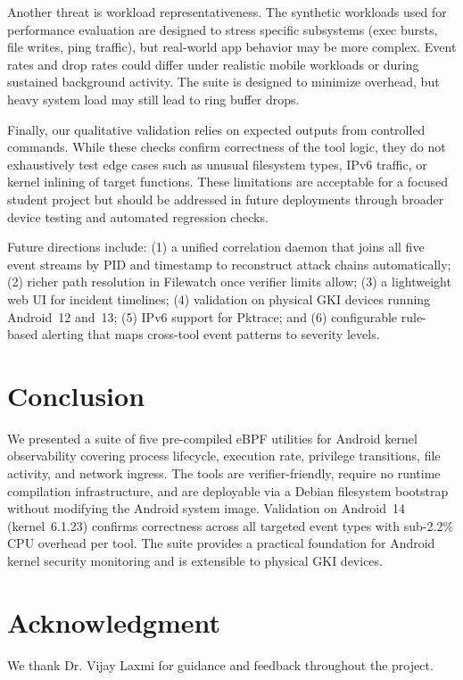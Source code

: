 \documentclass[conference]{IEEEtran}
\begin{document}
Another threat is workload representativeness. The synthetic workloads used for performance evaluation are designed to stress specific subsystems (exec bursts, file writes, ping traffic), but real-world app behavior may be more complex. Event rates and drop rates could differ under realistic mobile workloads or during sustained background activity. The suite is designed to minimize overhead, but heavy system load may still lead to ring buffer drops.

Finally, our qualitative validation relies on expected outputs from controlled commands. While these checks confirm correctness of the tool logic, they do not exhaustively test edge cases such as unusual filesystem types, IPv6 traffic, or kernel inlining of target functions. These limitations are acceptable for a focused student project but should be addressed in future deployments through broader device testing and automated regression checks.

Future directions include: (1) a unified correlation daemon that joins all five event streams by PID and timestamp to reconstruct attack chains automatically; (2) richer path resolution in Filewatch once verifier limits allow; (3) a lightweight web UI for incident timelines; (4) validation on physical GKI devices running Android~12 and~13; (5) IPv6 support for Pktrace; and (6) configurable rule-based alerting that maps cross-tool event patterns to severity levels.

\section{Conclusion}

We presented a suite of five pre-compiled eBPF utilities for Android kernel observability covering process lifecycle, execution rate, privilege transitions, file activity, and network ingress. The tools are verifier-friendly, require no runtime compilation infrastructure, and are deployable via a Debian filesystem bootstrap without modifying the Android system image. Validation on Android~14 (kernel~6.1.23) confirms correctness across all targeted event types with sub-2.2\% CPU overhead per tool. The suite provides a practical foundation for Android kernel security monitoring and is extensible to physical GKI devices.

\section*{Acknowledgment}
We thank Dr. Vijay Laxmi for guidance and feedback throughout the project.



\end{document}
